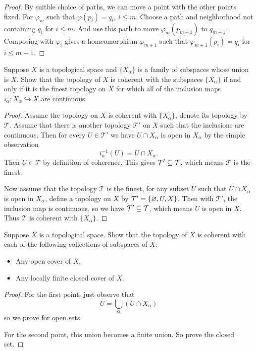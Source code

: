 \begin{proof}
By suitble choice of paths, we can move a point with the other points fixed. For $\varphi_m$ such that $\varphi(p_i)=q_i$, $i\leq m$. Choose a path and neighborhood not containing $q_i$ for $i\leq m$. And use this path to move $\varphi_m(p_{m+1})$ to $q_{m+1}$. Composing with $\varphi_i$ gives a homeomorphism $\varphi_{m+1}$ such that $\varphi_{m+1}(p_i)=q_i$ for $i\leq m+1$.
\end{proof}
\begin{exercise}
Suppose $X$ is a topological space and $\{X_\alpha\}$ is a family of subspaces whose union is $X$. Show that the topology of $X$ is coherent with the subspaces $\{X_\alpha\}$ if and only if it is the finest topology on $X$ for which all of the inclusion maps $i_\alpha:X_\alpha\hookrightarrow X$ are continuous.
\end{exercise}
\begin{proof}
Assume the topology on $X$ is coherent with $\{X_\alpha\}$, denote its topology by $\mathcal{T}$. Assume that there is another topology $\mathcal{T}'$ on $X$ such that the inclusions are continuous. Then for every $U\in\mathcal{T}'$ we have $U\cap X_\alpha$ is open in $X_\alpha$ by the simple observation
\[i_\alpha^{-1}(U)=U\cap X_\alpha.\]
Then $U\in\mathcal{T}$ by definition of coherence. This gives $\mathcal{T}'\subseteq\mathcal{T}$, which means $\mathcal{T}$ is the finest.\par
Now assume that the topology $\mathcal{T}$ is the finest, for any subset $U$ such that $U\cap X_\alpha$ is open in $X_\alpha$, define a topology on $X$ by $\mathcal{T}'=\{\varnothing,U,X\}$. Then with $\mathcal{T}'$, the inclusion map is continuous, so we have $\mathcal{T}'\subseteq\mathcal{T}$, which means $U$ is open in $X$. Thus $\mathcal{T}$ is coherent with $\{X_\alpha\}$.
\end{proof}
\begin{exercise}\label{space coherent topology eg}
Suppose $X$ is a topological space. Show that the topology of $X$ is coherent
with each of the following collections of subspaces of $X$:
\begin{itemize}
\item Any open cover of $X$.
\item Any locally finite closed cover of $X$.
\end{itemize}
\end{exercise}
\begin{proof}
For the first point, just observe that
\[U=\bigcup_\alpha(U\cap X_\alpha)\]
so we prove for open sets.\par
For the second point, this union becomes a finite union. So prove the closed set.
\end{proof}
